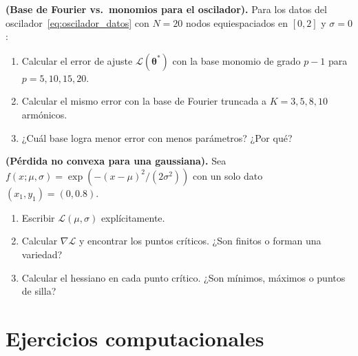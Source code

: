 \begin{ejercicio}
\label{ej:fourier_vs_monomial}
\textbf{(Base de Fourier vs.\ monomios para el oscilador).}
Para los datos del oscilador~\eqref{eq:oscilador_datos} con $N = 20$
nodos equiespaciados en $[0,2]$ y $\sigma = 0$:
\begin{enumerate}[label=(\alph*)]
  \item Calcular el error de ajuste $\mathcal{L}(\bm{\theta}^*)$ con
        la base monomio de grado $p-1$ para $p = 5, 10, 15, 20$.
  \item Calcular el mismo error con la base de Fourier truncada a
        $K = 3, 5, 8, 10$ armónicos.
  \item ¿Cuál base logra menor error con menos parámetros? ¿Por qué?
\end{enumerate}
\end{ejercicio}

\begin{ejercicio}
\label{ej:nolineal_gaussiana}
\textbf{(Pérdida no convexa para una gaussiana).}
Sea $f(x;\mu,\sigma) = \exp(-(x-\mu)^2/(2\sigma^2))$ con un solo dato
$(x_1, y_1) = (0, 0.8)$.
\begin{enumerate}[label=(\alph*)]
  \item Escribir $\mathcal{L}(\mu,\sigma)$ explícitamente.
  \item Calcular $\nabla\mathcal{L}$ y encontrar los puntos críticos.
        ¿Son finitos o forman una variedad?
  \item Calcular el hessiano en cada punto crítico. ¿Son mínimos,
        máximos o puntos de silla?
\end{enumerate}
\end{ejercicio}

\section*{Ejercicios computacionales}

